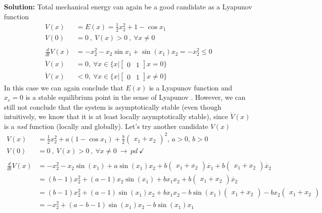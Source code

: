 \documentclass[twoside]{article}
\begin{document}
\textbf{Solution:} Total mechanical energy can again be a good candidate as
a Lyapunov function 
%
\begin{align*}
V(x) &= E(x) = \frac{1}{2} x_2^2 + 1 - \cos{x_1}  \\ 
V(0) &= 0 \ , \ V(x) > 0 \ , \ \forall x \neq 0
\\
\\
\frac{d}{dt} V(x) &= - x_2^2 - x_2 \sin x_1 + \sin(x_1) x_2 = - x_2^2 \leq 0
\\
\dot{V}(x) &= 0 ,\ \forall x \in \lbrace x | \begin{bmatrix}0 & 1\end{bmatrix} x = 0 \rbrace
\\
\dot{V}(x) &< 0 ,\ \forall x \in \lbrace x | \begin{bmatrix}0 & 1\end{bmatrix} x \neq 0 \rbrace
\end{align*}
%
In this case we can again conclude that $E(x)$ is a Lyapunov function and $x_e = 0$
is a stable equilibrium point in the sense of Lyapunov . However, we can still not 
conclude that the system is asymptotically stable (even though intuitively, we know that it is 
at least locally asymptotically stable), since $\dot{V}(x)$ is a \textit{nsd} function 
(locally and globally). Let's try another candidate $V(x)$
%
\begin{align*}
V(x) &= \frac{1}{2} x_2^2 + a ( 1 - \cos{x_1} ) + \frac{b}{2} \begin{pmatrix} x_1 + x_2 \end{pmatrix}^2  ,
\, a > 0 , \,  b > 0
\\ 
V(0) &= 0 \ , \ V(x) > 0 \ , \ \forall x \neq 0 \ \rightarrow \ pd \ \checkmark
\\
\\
\frac{d}{dt} V(x) &= - x_2^2 - x_2 \sin(x_1) + a \sin(x_1) x_2 + b \begin{pmatrix} x_1 + x_2 \end{pmatrix} \dot{x_1} 
+ b \begin{pmatrix} x_1 + x_2 \end{pmatrix} \dot{x_2}
\\
&= (b - 1) x_2^2 + (a - 1) x_2 \sin(x_1) + b x_1 x_2 
+ b \begin{pmatrix} x_1 + x_2 \end{pmatrix} \dot{x_2}
\\
&= (b - 1) x_2^2 + (a - 1) \sin(x_1) x_2 + b x_1 x_2 
- b \sin(x_1) \begin{pmatrix} x_1 + x_2 \end{pmatrix} 
- b x_2\begin{pmatrix} x_1 + x_2 \end{pmatrix} 
\\
&= - x_2^2 + (a - b - 1) \sin(x_1) x_2 - b \sin(x_1) x_1 
\end{align*}
\end{document}
